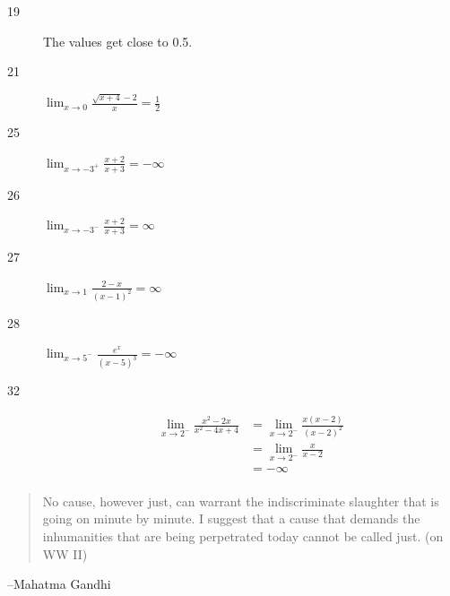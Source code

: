 \documentclass[letterpaper, landscape]{exam}
\begin{document}
\begin{description}

      \item[19] The values get close to 0.5.

      \item[21] $\lim_{x \to 0} \frac{\sqrt{x + 4} - 2}{x} = \boxed{ \frac{1}{2} }$ 

      \item[25] $\lim_{x \to -3^+} \frac{x + 2}{x + 3} = \boxed{ -\infty }$ 

      \item[26] $\lim_{x \to -3^-} \frac{x + 2}{x + 3} = \boxed{ \infty }$ 

      \item[27] $\lim_{x \to 1} \frac{2 - x}{(x - 1)^2} = \boxed{ \infty }$ 

      \item[28] $\lim_{x \to 5^-} \frac{e^x}{(x - 5)^3} = \boxed{ -\infty }$ 

      \item[32] 
        \begin{align*}
          \lim_{x \to 2^-} \frac{x^2 - 2x}{x^2 - 4x + 4}   
            & = \lim_{x \to 2^-} \frac{x(x - 2)}{(x - 2)^2} \\
            & = \lim_{x \to 2^-} \frac{x}{x - 2} \\
            & = \boxed{ - \infty } \\
        \end{align*}


    \end{description}

  \else
    \vspace{11 cm}
    \begin{quote}
      \begin{em}
        No cause, however just, can warrant the indiscriminate slaughter that is
        going on minute by minute. I suggest that a cause that demands the
        inhumanities that are being perpetrated today cannot be called just. 
        (on WW II)
      \end{em}
    \end{quote}
    \hspace{1 cm} --Mahatma Gandhi
  \fi
\end{document}
